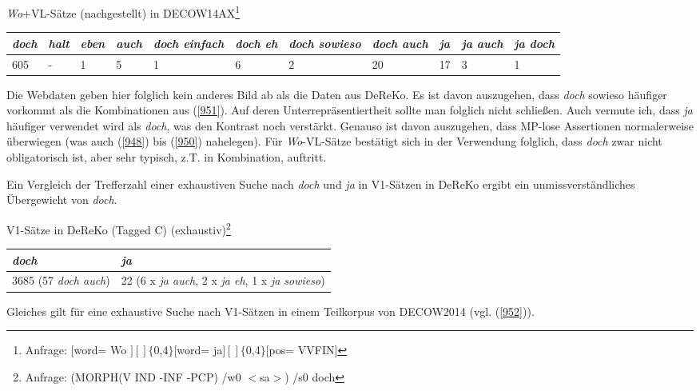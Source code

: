 {\begin{exe}
	\ex\label{951} \textit{Wo}+VL-Sätze (nachgestellt) in DECOW14AX\footnote{ Anfrage: $[$word= \glqq Wo\grqq{} $][]\lbrace$0,4$\rbrace[$word= \glqq ja\grqq{}$][ ]\lbrace$0,4$\rbrace[$pos= \glqq VVFIN\grqq{}$]$} \\
	\scriptsize
    \begin{tabular}[t]{|l|l|l|l|l|l|l|l|l|l|l|}
    \hline
    \textit{doch} & \textit{halt} & \textit{eben} & \textit{auch} & \textit{doch einfach} & \textit{doch eh} & \textit{doch sowieso} & \textit{doch auch} & 	\textit{ja} & \textit{ja auch} & \textit{ja doch} \\
	\hline
    605 & - & 1 & 5 & 1 & 6 & 2 & 20 & 17 & 3 & 1\\
    \hline	 
    \end{tabular}   
\end{exe}
Die Webdaten geben hier folglich kein anderes Bild ab als die Daten aus DeReKo. Es ist davon auszugehen, dass \textit{doch} sowieso häufiger vorkommt als die Kombinationen aus (\ref{951}). Auf deren Unterrepräsentiertheit sollte man folglich nicht schließen. Auch vermute ich, dass \textit{ja} häufiger verwendet wird als \textit{doch}, was den Kontrast noch verstärkt. Genauso ist davon auszugehen, dass MP-lose Assertionen normalerweise überwiegen (was auch (\ref{948}) bis (\ref{950}) nahelegen). Für \textit{Wo}-VL-Sätze bestätigt sich in der Verwendung folglich, dass \textit{doch} zwar nicht obligatorisch ist, aber sehr typisch, z.T. in Kombination, auftritt.

Ein Vergleich der Trefferzahl einer exhaustiven Suche nach \textit{doch} und \textit{ja} in V1-Sätzen in DeReKo ergibt ein unmissverständliches Übergewicht von \textit{doch}.

\begin{exe}
	\ex\label{951a} V1-Sätze in DeReKo (Tagged C) (exhaustiv)\footnote{ Anfrage: (MORPH(V IND -INF -PCP) /w0 $<$sa$>$) /s0 doch}\\[-1em]
    \begin{tabular}[t]{|l|l|}
    \hline
    \textit{doch} & \textit{ja}\\
    \hline	 
    3685 (57 \textit{doch auch}) & 22 (6 x \textit{ja auch}, 2 x \textit{ja eh}, 1 x \textit{ja sowieso})\\    
    \hline
    \end{tabular}   
\end{exe}
Gleiches gilt für eine exhaustive Suche nach V1-Sätzen in einem Teilkorpus von DECOW2014 (vgl. (\ref{952})).

}
